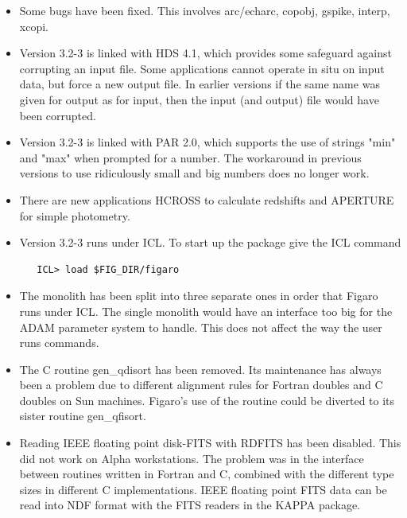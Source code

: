 \begin{itemize}
\item
   Some bugs have been fixed. This involves arc/echarc, copobj, gspike,
   interp, xcopi.

\item
   Version 3.2-3 is linked with HDS 4.1, which provides some safeguard
   against corrupting an input file. Some applications cannot operate in
   situ on input data, but force a new output file. In earlier versions
   if the same name was given for output as for input, then the input
   (and output) file would have been corrupted.

\item
   Version 3.2-3 is linked with PAR 2.0, which supports the use of
   strings "min" and "max" when prompted for a number. The workaround in
   previous versions to use ridiculously small and big numbers does no
   longer work.

\item
   There are new applications HCROSS to calculate redshifts and APERTURE
   for simple photometry.

\item
   Version 3.2-3 runs under ICL. To start up the package give the ICL
   command

\begin{verbatim}
   ICL> load $FIG_DIR/figaro
\end{verbatim}

\item
   The monolith has been split into three separate ones in order that
   Figaro runs under ICL. The single monolith would have an interface
   too big for the ADAM parameter system to handle. This does not affect
   the way the user runs commands.

\item
   The C routine gen\_qdisort has been removed. Its maintenance has
   always been a problem due to different alignment rules for Fortran
   doubles and C doubles on Sun machines. Figaro's use of the routine
   could be diverted to its sister routine gen\_qfisort.

\item
   Reading IEEE floating point disk-FITS with RDFITS has been disabled.
   This did not work on Alpha workstations. The problem was in the
   interface between routines written in Fortran and C, combined with
   the different type sizes in different C implementations. IEEE
   floating point FITS data can be read into NDF format with the FITS
   readers in the KAPPA package.


\end{itemize}

